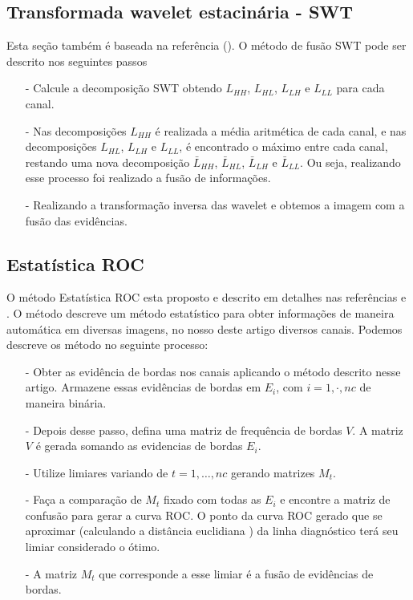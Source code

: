 \documentclass[conference]{IEEEtran}
\begin{document}
\subsection{Transformada wavelet estacinária - SWT} Esta seção também é baseada na referência (\cite{n_r}). O método de fusão SWT pode ser descrito nos seguintes passos
\begin{itemize}
\item[-] Calcule a decomposição SWT obtendo $L_{HH}$, $L_{HL}$, $L_{LH}$ e $L_{LL}$ para cada canal.
\item[-] Nas decomposições $L_{HH}$ é realizada a média aritmética de cada canal, e nas decomposições $L_{HL}$, $L_{LH}$ e $L_{LL}$, é encontrado o máximo entre cada canal, restando uma nova decomposição $\bar{L}_{HH}$, $\bar{L}_{HL}$, $\bar{L}_{LH}$ e $\bar{L}_{LL}$. Ou seja, realizando esse processo foi realizado a fusão de informações.
\item[-] Realizando a transformação inversa das wavelet e obtemos a imagem com a fusão das evidências.  
\end{itemize}
\subsection{Estatística ROC}
O método Estatística ROC esta proposto e descrito em detalhes nas referências \cite{gs} e \cite{fawcett}. O método descreve um método estatístico para obter informações de maneira automática em diversas imagens, no nosso deste artigo diversos canais. Podemos descreve os método no seguinte processo:
\begin{itemize}
\item[-] Obter as evidência de bordas nos canais aplicando o método descrito nesse artigo. Armazene essas evidências de bordas em $E_i$, com $i=1,\cdot,nc$ de maneira binária.
\item[-] Depois desse passo, defina uma matriz de frequência de bordas $V$. A matriz  $V$ é gerada somando as evidencias de bordas $E_i$.
\item[-] Utilize limiares variando de $t=1,\dots,nc$ gerando matrizes $M_t$. 
\item[-] Faça a comparação de $M_t$ fixado com todas as $E_i$ e  encontre a matriz de confusão para gerar a curva ROC. O ponto da curva ROC gerado que se aproximar (calculando a distância euclidiana ) da linha diagnóstico terá seu limiar considerado o ótimo.
\item[-] A matriz $M_t$ que corresponde a esse limiar é a fusão de evidências de bordas.
\end{itemize}
  
\end{document}
